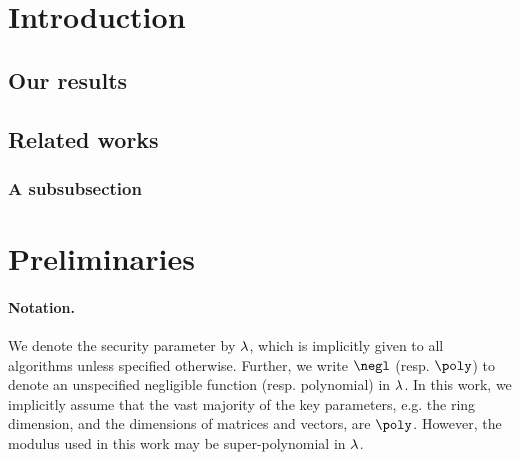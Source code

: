 \documentclass[11pt,letterpaper]{article}
\theoremstyle{definition} %
\newcommand{\doclearpage}{%
	\iffull
	\clearpage
	\fi
}
\begin{document}
	\doclearpage
	\section{Introduction}
	\label{sec:introduction}
	
	
	\subsection{Our results}
	\label{sec:our-results}
	
	
	\subsection{Related works}
	\label{sec:related-works}
	
	\subsubsection{A subsubsection}
	
	
	
	\doclearpage
	
	
	\doclearpage

\section{Preliminaries}\label{sec:prelims}
\paragraph{Notation.} We denote the security parameter by $\lambda$, which is implicitly given to all algorithms unless specified otherwise. Further, we write $\negl$ (resp. $\poly$) to denote an unspecified negligible function (resp. polynomial) in $\lambda$. In this work, we implicitly assume that the vast majority of the key parameters, e.g. the ring dimension, and the dimensions of matrices and vectors, are $\poly$. However, the modulus used in this work may be super-polynomial in $\lambda$.
\end{document}
